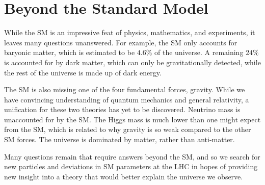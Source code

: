 \section{Beyond the Standard Model}
While the SM is an impressive feat of physics, mathematics, and experiments, it leaves many questions unanswered. For example, the SM only accounts for baryonic matter, which is estimated to be $4.6\%$ of the universe. A remaining $24\%$ is accounted for by dark matter, which can only be gravitationally detected, while the rest of the universe is made up of dark energy.

The SM is also missing one of the four fundamental forces, gravity. While we have convincing understanding of quantum mechanics and general relativity, a unification for these two theories has yet to be discovered. Neutrino mass is unaccounted for by the SM. The Higgs mass is much lower than one might expect from the SM, which is related to why gravity is so weak compared to the other SM forces. The universe is dominated by matter, rather than anti-matter. 

Many questions remain that require answers beyond the SM, and so we search for new particles and deviations in SM parameters at the LHC in hopes of providing new insight into a theory that would better explain the universe we observe.